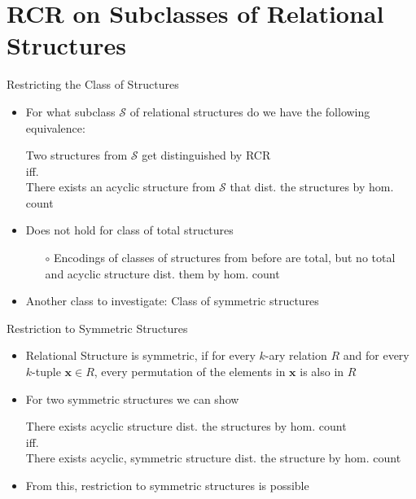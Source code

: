 \documentclass[aspectratio=169]{beamer}
\begin{document}
	\section{RCR on Subclasses of Relational Structures}
	
	\begin{frame}{Restricting the Class of Structures}
		\begin{itemize}
			\item For what subclass $\mathcal S$ of relational structures do we have the following equivalence:
			\begin{center}
				Two structures from $\mathcal S$ get distinguished by RCR\\
				iff.\\
				There exists an acyclic structure from $\mathcal S$ that dist. the structures by hom. count
			\end{center}
			\item Does not hold for class of total structures
			\begin{itemize}
				\item[$\circ$] Encodings of classes of structures from before are total, but no total and acyclic structure dist. them by hom. count
			\end{itemize}
			\item Another class to investigate: Class of symmetric structures
		\end{itemize}
	\end{frame}
	
	\begin{frame}{Restriction to Symmetric Structures}
		\begin{itemize}
			\item Relational Structure is symmetric, if for every $k$-ary relation $R$ and for every $k$-tuple $\mathbf x\in R$, every permutation of the elements in $\mathbf x$ is also in $R$
			\pause
			\item For two symmetric structures we can show
			\begin{center}
				There exists acyclic structure dist. the structures by hom. count\\
				iff.\\
				There exists acyclic, symmetric structure dist. the structure by hom. count
			\end{center}
			\item From this, restriction to symmetric structures is possible
		\end{itemize}
	\end{frame}
	
\end{document}
